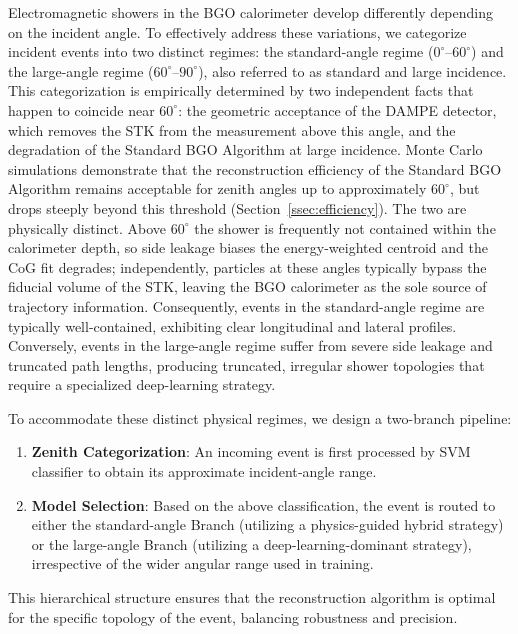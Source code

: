 \documentclass[preprint,12pt]{elsarticle}
\begin{document}
Electromagnetic showers in the BGO calorimeter develop differently depending on the incident angle. To effectively address these variations, we categorize incident events into two distinct regimes: the standard-angle regime ($0^{\circ}$--$60^{\circ}$) and the large-angle regime ($60^{\circ}$--$90^{\circ}$), also referred to as standard and large incidence. This categorization is empirically determined by two independent facts that happen to coincide near $60^{\circ}$: the geometric acceptance of the DAMPE detector, which removes the STK from the measurement above this angle, and the degradation of the Standard BGO Algorithm at large incidence. Monte Carlo simulations demonstrate that the reconstruction efficiency of the Standard BGO Algorithm remains acceptable for zenith angles up to approximately $60^{\circ}$, but drops steeply beyond this threshold (Section~\ref{ssec:efficiency}). The two are physically distinct. Above $60^{\circ}$ the shower is frequently not contained within the calorimeter depth, so side leakage biases the energy-weighted centroid and the CoG fit degrades; independently, particles at these angles typically bypass the fiducial volume of the STK, leaving the BGO calorimeter as the sole source of trajectory information. Consequently, events in the standard-angle regime are typically well-contained, exhibiting clear longitudinal and lateral profiles. Conversely, events in the large-angle regime suffer from severe side leakage and truncated path lengths, producing truncated, irregular shower topologies that require a specialized deep-learning strategy.

To accommodate these distinct physical regimes, we design a two-branch pipeline:

\begin{enumerate}
    \item \textbf{Zenith Categorization}: An incoming event is first processed by SVM classifier to obtain its approximate incident‑angle range.
    \item \textbf{Model Selection}: Based on the above classification, the event is routed to either the standard-angle Branch (utilizing a physics-guided hybrid strategy) or the large-angle Branch (utilizing a deep-learning-dominant strategy), irrespective of the wider angular range used in training.
\end{enumerate}

This hierarchical structure ensures that the reconstruction algorithm is optimal for the specific topology of the event, balancing robustness and precision. 
\end{document}
